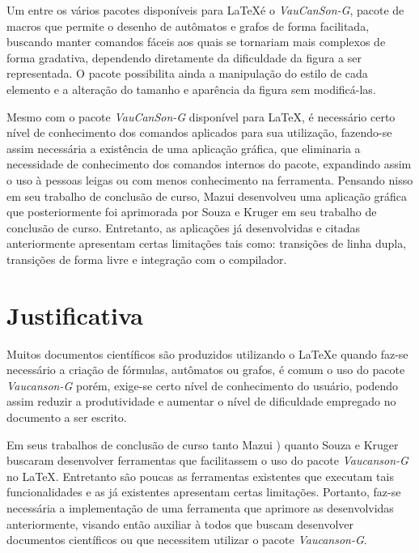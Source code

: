 \documentclass[a4paper,12pt,portuguese]{ufms-cpcx}
\begin{document}
 Um entre os vários pacotes disponíveis para \LaTeX é o \textit{VauCanSon-G}, pacote de macros que permite o desenho  de autômatos e grafos de forma facilitada, buscando manter comandos fáceis aos quais se tornariam mais complexos de forma gradativa, dependendo diretamente da dificuldade da figura a ser representada. O pacote possibilita ainda a manipulação do estilo de cada elemento e a alteração do tamanho e aparência da figura sem modificá-las.
 
 Mesmo com o pacote \textit{VauCanSon-G} disponível para \LaTeX, é necessário certo nível de conhecimento dos comandos aplicados para sua utilização, fazendo-se assim necessária a existência de uma aplicação gráfica, que eliminaria a necessidade de conhecimento dos comandos internos do pacote, expandindo assim o uso à pessoas leigas ou com menos conhecimento na ferramenta. Pensando nisso em seu trabalho de conclusão de curso, Mazui\cite {Mazui, 2007} desenvolveu uma aplicação gráfica que posteriormente foi aprimorada por Souza e Kruger \cite{Souza, Kruger (2010)} em seu trabalho de conclusão de curso. Entretanto, as aplicações já desenvolvidas e citadas anteriormente apresentam certas limitações tais como: transições de linha dupla, transições de forma livre e integração com o compilador. 
 
 
 
 \section{Justificativa} 
 
 Muitos documentos científicos são produzidos utilizando o \LaTeX e quando faz-se necessário a criação de fórmulas, autômatos ou grafos, é comum o uso do pacote \textit {Vaucanson-G} porém, exige-se certo nível de conhecimento do usuário, podendo assim reduzir a produtividade e aumentar o nível de dificuldade empregado no documento a ser escrito. 
 
 Em seus trabalhos de conclusão de curso tanto Mazui \cite{Mazui(2007}) quanto Souza e Kruger \cite{Souza e Kruger(2010)} buscaram desenvolver ferramentas que facilitassem o uso do pacote \textit{Vaucanson-G} no \LaTeX. Entretanto são poucas as ferramentas existentes que executam tais funcionalidades e as já existentes apresentam certas limitações. Portanto, faz-se necessária a implementação de uma ferramenta que aprimore as desenvolvidas anteriormente, visando então auxiliar à todos que buscam desenvolver documentos científicos ou que necessitem utilizar o pacote \textit{Vaucanson-G}.
 
\end{document}
